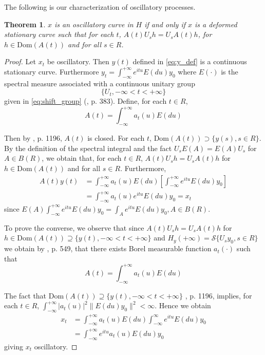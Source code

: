 \documentclass{article}
\newtheorem{theorem}{Theorem}
\begin{document}
The following is our characterization of oscillatory processes.

\begin{theorem}\label{thm:characterization}
$x$ is an oscillatory curve in $H$ if and only if $x$ is a deformed stationary curve such that for each $t$, $A(t) U_{s} h=U_{s} A(t) h$, for $h \in \mathrm{Dom}(A(t))$ and for all $s \in R$.
\end{theorem}

\begin{proof}
Let $x_{t}$ be oscillatory. Then $y(t)$ defined in \eqref{eq:y_def} is a continuous stationary curve. Furthermore $y_{t}=\int_{-\infty}^{+\infty} e^{i t u} E(du) y_{0}$ where $E(\cdot)$ is the spectral measure associated with a continuous unitary group
\begin{equation}
\{U_{t},-\infty<t<+\infty\} \label{eq:unitary_group}
\end{equation}
given in \eqref{eq:shift_group} (\cite{Riesz}, p. 383). Define, for each $t \in R$,
\begin{equation}
A(t)=\int_{-\infty}^{+\infty} a_{t}(u) E(du) \label{eq:A_def}
\end{equation}

Then by \cite{Dunford}, p. 1196, $A(t)$ is closed. For each $t$, $\mathrm{Dom}(A(t)) \supset \{y(s), s \in R\}$. By the definition of the spectral integral and the fact $U_{s} E(A)=E(A) U_{s}$ for $A \in B(R)$, we obtain that, for each $t \in R$, $A(t) U_{s} h=U_{s} A(t) h$ for $h \in \mathrm{Dom}(A(t))$ and for all $s \in R$. Furthermore,
\begin{align}
A(t) y(t) &=\int_{-\infty}^{+\infty} a_{t}(u) E(du)\left[\int_{-\infty}^{+\infty} e^{i t u} E(du) y_{0}\right] \label{eq:At_yt} \\
&=\int_{-\infty}^{+\infty} a_{t}(u) e^{i t u} E(du) y_{0}=x_{t} \nonumber
\end{align}
since $E(A) \int_{-\infty}^{+\infty} e^{i t u} E(du) y_{0}=\int_{A} e^{i t u} E(du) y_{0}, A \in B(R)$.

To prove the converse, we observe that since $A(t) U_{s} h=U_{s} A(t) h$ for $h \in \mathrm{Dom}(A(t)) \supseteq \{y(t),-\infty<t<+\infty\}$ and $H_{y}(+\infty)=\mathcal{S}\{U_{s} y_{0}, s \in R\}$ we obtain by \cite{Masani}, p. 549, that there exists Borel measurable function $a_{t}(\cdot)$ such that
\begin{equation}
A(t)=\int_{-\infty}^{+\infty} a_{t}(u) E(du) \label{eq:A_def_converse}
\end{equation}

The fact that $\mathrm{Dom}(A(t)) \supseteq \{y(t),-\infty<t<+\infty\}$ \cite{Dunford}, p. 1196, implies, for each $t \in R$, $\int_{-\infty}^{+\infty}|a_{t}(u)|^{2}\|E(du) y_{0}\|^{2}<\infty$. Hence we obtain
\begin{align}
x_{t} &=\int_{-\infty}^{+\infty} a_{t}(u) E(du) \int_{-\infty}^{\infty} e^{i t u} E(du) y_{0} \label{eq:xt_spectral} \\
&=\int_{-\infty}^{+\infty} e^{i t u} a_{t}(u) E(du) y_{0} \nonumber
\end{align}
giving $x_{t}$ oscillatory.
\end{proof}
\end{document}
